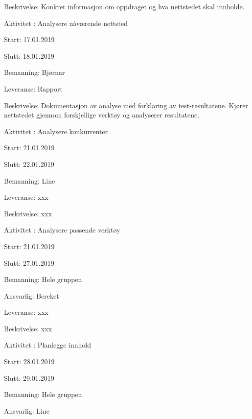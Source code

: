 \documentclass[11pt,a4paper]{report}
\begin{document}
\begin{compactdesc}
\begin{compactitem}
	\item Beskrivelse: Konkret informasjon om oppdraget og hva nettstedet skal innholde.
	\addtocounter{aktivitetTeller}{1}
	\end{compactitem}
	\item [Aktivitet \arabic{aktivitetTeller}:] Analysere nåværende nettsted
	\begin{compactitem}
	\item Start: 17.01.2019
	\item Slutt: 18.01.2019
	\item Bemanning: Bjørnar
	\item Leveranse: Rapport
	\item Beskrivelse: Dokumentasjon av analyse med forklaring av test-resultatene. Kjører nettstedet gjennom forskjellige verktøy og analyserer resultatene.
	\addtocounter{aktivitetTeller}{1}
	\end{compactitem}
	\item [Aktivitet \arabic{aktivitetTeller}:] Analysere konkurrenter
	\begin{compactitem}
	\item Start: 21.01.2019
	\item Slutt: 22.01.2019
	\item Bemanning: Line
	\item Leveranse: xxx
	\item Beskrivelse: xxx
	\addtocounter{aktivitetTeller}{1}
	\end{compactitem}
	\item [Aktivitet \arabic{aktivitetTeller}:] Analysere passende verktøy
	\begin{compactitem}
	\item Start: 21.01.2019
	\item Slutt: 27.01.2019
	\item Bemanning: Hele gruppen
	\item Ansvarlig: Bereket
	\item Leveranse: xxx
	\item Beskrivelse: xxx
	\addtocounter{aktivitetTeller}{1}
	\end{compactitem}
	\item [Aktivitet \arabic{aktivitetTeller}:] Planlegge innhold
	\begin{compactitem}
	\item Start: 28.01.2019
	\item Slutt: 29.01.2019
	\item Bemanning: Hele gruppen
	\item Ansvarlig: Line

\end{compactitem}
\end{compactdesc}
\end{document}
